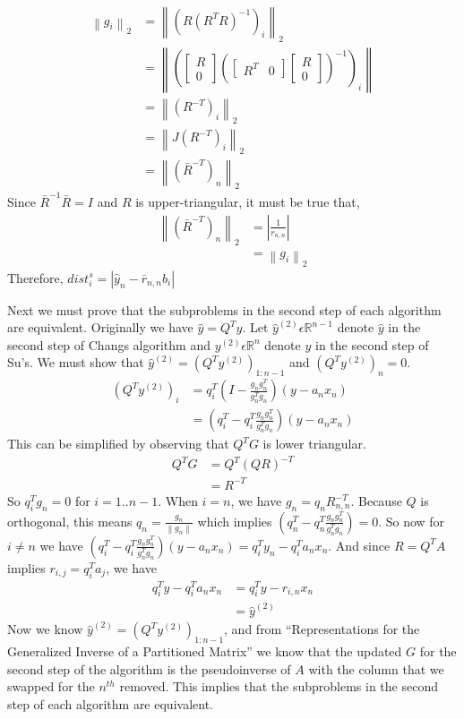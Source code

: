 \documentclass[11pt]{article}	%
\numberwithin{algorithm}{section}
\begin{document}
\begin{align*}
\left \| g_i \right \|_2 &= \left \| (R(R^TR)^{-1})_i \right \|_2 \\
&=\left \| \left ( \begin{bmatrix}R\\0\end{bmatrix} \left(\begin{bmatrix}R^T &
0\end{bmatrix}\begin{bmatrix}R\\0\end{bmatrix}\right)^{-1} \right )_i \right \|
\\
&= \left \| (R^{-T})_i \right \|_2 \\
&= \left \| J(R^{-T})_i \right \|_2 \\
&= \left \| (\bar{R}^{-T})_n \right \|_2
\end{align*}
Since $\bar{R}^{-1}\bar{R} = I$ and $R$ is upper-triangular, it must be true
that,
\begin{align*}
\left \| (\bar{R}^{-T})_n \right \|_2 &= \left | \frac{1}{r_{n,n}} \right | \\
&=\left \| g_i \right \|_2
\end{align*}
Therefore, $dist_i^s =\left | \hat{y}_n-\bar{r}_{n,n}b_i \right |$


Next we must prove that the subproblems in the second step of each algorithm
are equivalent. Originally we have $\hat{y} =Q^Ty$. Let $\hat{y}^{(2)}
\epsilon\mathbb{R}^{n-1}$ denote $\hat{y}$ in the second step of Changs
algorithm and $y^{(2)} \epsilon\mathbb{R}^n$ denote $y$ in the second step
of Su's. We must show that $\hat{y}^{(2)} = (Q^Ty^{(2)})_{1:n-1}$ and
$(Q^Ty^{(2)})_n = 0$.
\begin{align*}
(Q^Ty^{(2)})_i &= q_i^T(I-\frac{g_ng_n^T}{g_n^Tg_n})(y-a_nx_n) \\
&= (q_i^T - q_i^T\frac{g_ng_n^T}{g_n^Tg_n})(y-a_nx_n)
\end{align*}
This can be simplified by observing that $Q^TG$ is lower triangular.
\begin{align*}
Q^TG &= Q^T(QR)^{-T} \\
&=R^{-T}
\end{align*}
So $q_i^Tg_n = 0$ for $i=1..n-1$. When $i=n$, we have $g_n = q_nR^{-T}_{n,n}$.
Because $Q$ is orthogonal, this
means $q_n=\frac{g_n}{\left \| g_n \right \|}$ which implies $(q_n^T -
q_n^T\frac{g_ng_n^T}{g_n^Tg_n}) = 0$. So now for $i \ne n$ we have $(q_i^T -
q_i^T\frac{g_ng_n^T}{g_n^Tg_n})(y-a_nx_n) = q_i^Ty_n - q_i^Ta_nx_n$. And since
$R = Q^TA$ implies $r_{i,j} = q_i^Ta_j$, we have 
\begin{align*}
q_i^Ty - q_i^Ta_nx_n &= q_i^Ty - r_{i,n}x_n \\
&= \hat{y}^{(2)} 
\end{align*}
Now we know $\hat{y}^{(2)} = (Q^Ty^{(2)})_{1:n-1}$, and from ``Representations
for the Generalized Inverse of a Partitioned Matrix'' we know that the updated
$G$ for the second step of the algorithm is the pseudoinverse of $A$ with the
column that we swapped for the $n^{th}$ removed. This implies that the
subproblems in the second step of each algorithm are equivalent.\\\\
\end{document}
